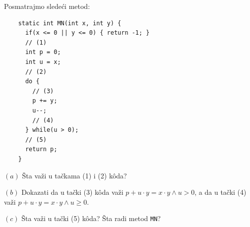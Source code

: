 \begin{EX}
  Posmatrajmo slede\'ci metod:
{\small
\begin{verbatim}
    static int MN(int x, int y) {
      if(x <= 0 || y <= 0) { return -1; }
      // (1)
      int p = 0;
      int u = x;
      // (2)
      do {
        // (3)
        p += y;
        u--;
        // (4)
      } while(u > 0);
      // (5)
      return p;
    }
\end{verbatim}
}

\medskip

\noindent
$(a)$ \v Sta va\v zi u ta\v ckama (1) i (2) k\^oda?

\medskip

\noindent
$(b)$ Dokazati da u ta\v cki (3) k\^oda va\v zi $p + u\cdot y = x \cdot y \land u > 0$, a da u ta\v cki (4) va\v zi $p + u\cdot y = x \cdot y \land u \ge 0$.

\medskip

\noindent
$(c)$ \v Sta va\v zi u ta\v cki (5) k\^oda? \v Sta radi metod \verb"MN"?
\end{EX}
